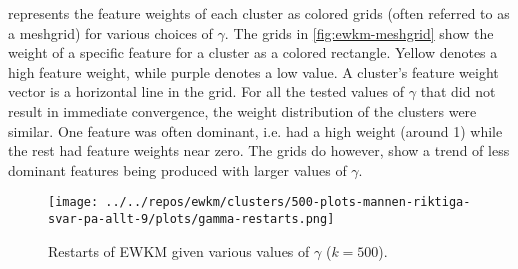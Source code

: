 \documentclass[../report.tex]{subfiles}
\begin{document}
 represents the feature weights of each cluster as colored grids (often referred to as a meshgrid) for various choices of $\gamma$. The grids in \cref{fig:ewkm-meshgrid} show the weight of a specific feature for a cluster as a colored rectangle. Yellow denotes a high feature weight, while purple denotes a low value. A cluster's feature weight vector is a horizontal line in the grid. For all the tested values of $\gamma$ that did not result in immediate convergence, the weight distribution of the clusters were similar. One feature was often dominant, i.e. had a high weight (around 1) while the rest had feature weights near zero. The grids do however, show a trend of less dominant features being produced with larger values of $\gamma$.


\begin{frame}

  \begin{figure}
\centering
\begin{minipage}{.6\textwidth}
  \texttt{[image: ../../repos/ewkm/clusters/500-plots-mannen-riktiga-svar-pa-allt-9/plots/gamma-restarts.png]}
  \caption{Restarts of EWKM given various values of $\gamma$ ($k=500$).}
  \label{fig:ewkm-restarts}
\end{minipage}
\end{figure}

\end{frame}

\end{document}
